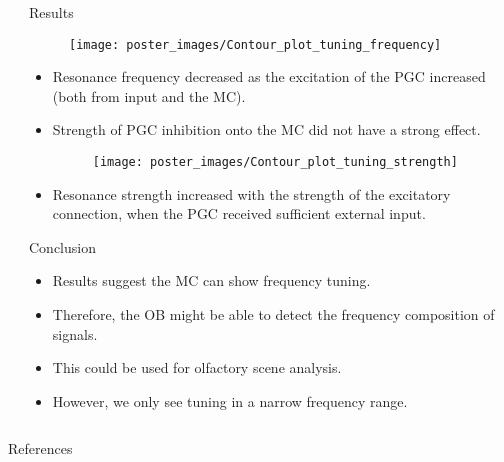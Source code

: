 \documentclass[final,hyperref={pdfpagelabels=false}]{beamer}
\begin{document}
\begin{frame}{}
\begin{columns}[t]
\begin{column}{.48\linewidth}
\end{column}
\begin{column}{.48\linewidth}

\begin{block}{Results}
\begin{figure}
\center
\texttt{[image: poster\_images/Contour\_plot\_tuning\_frequency]}
\end{figure}

\begin{itemize}
\item Resonance frequency decreased as the excitation of the PGC increased (both from input and the MC).
\item Strength of PGC inhibition onto the MC did not have a strong effect.

\begin{figure}
\center
\texttt{[image: poster\_images/Contour\_plot\_tuning\_strength]}
\end{figure} 

\item Resonance strength increased with the strength of the excitatory connection, when the PGC received sufficient external input.
\end{itemize}
\end{block}

\begin{block}{Conclusion}
\begin{itemize}
\item Results suggest the MC can show frequency tuning.
\item Therefore, the OB might be able to detect the frequency composition of signals.
\item This could be used for olfactory scene analysis.
\item However, we only see tuning in a narrow frequency range.
\end{itemize}
\end{block}

\end{column}
\end{columns}

\begin{block}{References}
\nocite{*}

{\footnotesize
}
\end{block}

\end{frame}
\end{document}
